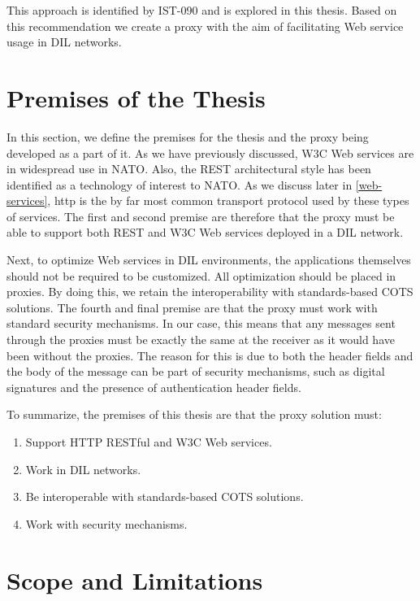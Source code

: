 This approach is identified by IST-090 and is explored in this thesis. Based on
this recommendation we create a proxy with the aim of facilitating Web service
usage in DIL networks.


\section{Premises of the Thesis}

In this section, we define the premises for the thesis and the proxy being
developed as a part of it. As we have previously discussed, W3C Web services are
in widespread use in NATO. Also, the REST architectural style has been identified
as a technology of interest to NATO. As we discuss later in \cref{web-services},
\gls{http} is the by far most common transport protocol used by these types of
services. The first and second premise are therefore that the proxy must be able
to support both REST and W3C Web services deployed in a DIL network.

Next, to optimize Web services in DIL environments, the applications themselves
should not be required to be customized. All optimization should be placed in
proxies. By doing this, we retain the interoperability with standards-based COTS
solutions. The fourth and final premise are that the proxy must work with
standard security mechanisms. In our case, this means that any messages sent
through the proxies must be exactly the same at the receiver as it would have
been without the proxies. The reason for this is due to both the header fields
and the body of the message can be part of security mechanisms, such as digital
signatures and the presence of authentication header fields.

To summarize, the premises of this thesis are that the proxy solution must:

\begin{enumerate}
    \item Support HTTP RESTful and W3C Web services.
    \item Work in DIL networks.
    \item Be interoperable with standards-based COTS solutions.
    \item Work with security mechanisms.
\end{enumerate}

\section{Scope and Limitations}

